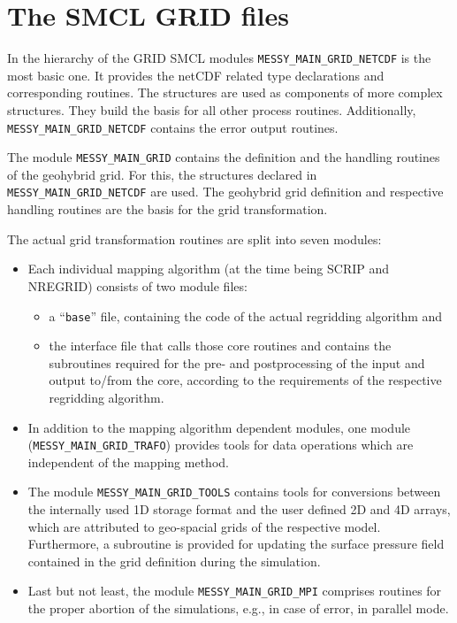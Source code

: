 \documentclass[11pt,twoside]{article}
\begin{document}
\section{The SMCL GRID files\label{SMCL}}
In the hierarchy of the GRID SMCL
modules \verb|MESSY_MAIN_GRID_NETCDF| is the most basic one.  
It provides the netCDF related type declarations and corresponding 
 routines. 
The structures are used as components of more complex structures. 
They build the basis for all other process routines. 
Additionally, \verb|MESSY_MAIN_GRID_NETCDF| contains the error output
routines. 

The module \verb|MESSY_MAIN_GRID| contains the definition and the 
handling routines of the geohybrid grid. For this, the
structures declared in  \verb|MESSY_MAIN_GRID_NETCDF| are used.
The geohybrid grid definition and respective handling routines are
the basis for the grid transformation.

The actual grid transformation routines are split into seven modules:
\begin{itemize}
\item Each individual mapping algorithm 
 (at the time being SCRIP and NREGRID) consists of two module files:
\begin{itemize}
\item a ``\verb|base|'' file, containing the code of the actual 
regridding algorithm and
\item the interface file that calls those core routines and contains
the subroutines required for the pre- and postprocessing of the input
 and output to/from the core, according to the requirements of the respective 
regridding algorithm.
\end{itemize}
\item In addition to the mapping algorithm dependent modules, one module 
(\verb|MESSY_MAIN_GRID_TRAFO|) provides tools for data operations
which are independent of the mapping method.
\item The module \verb|MESSY_MAIN_GRID_TOOLS| contains tools for
conversions between the internally used 1D storage format and the user
defined 2D and 4D arrays, which are attributed to geo-spacial grids of the
respective model.
Furthermore, a subroutine is provided for updating the surface pressure field
contained in the grid definition during the simulation.

\item Last but not least, the module \verb|MESSY_MAIN_GRID_MPI|
comprises routines for the proper abortion of the simulations, e.g., in
case of error, in parallel mode. 
\end{itemize}
\end{document}
